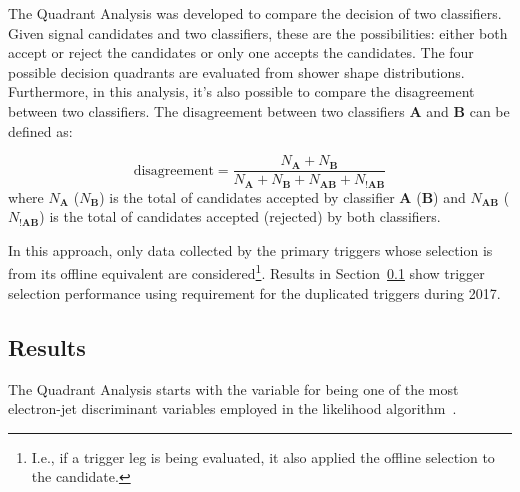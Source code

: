 The Quadrant Analysis was developed to compare the decision of two classifiers. Given signal candidates and two classifiers, these are the possibilities: either both accept or reject the candidates or only one accepts the candidates. The four possible decision quadrants are evaluated from shower shape distributions. Furthermore, in this analysis, it's also possible to compare the disagreement between two classifiers. The disagreement between two classifiers $\textbf{A}$ and $\textbf{B}$ can be defined as:

\begin{equation}
    \text{disagreement} = \frac{N_{\textbf{A}}+N_{\textbf{B}}}{N_{\textbf{A}}+N_{\textbf{B}}+N_{\textbf{AB}}+N_{!\textbf{AB}}}
    \label{eq:disagreement}
\end{equation}
where $N_{\textbf{A}}$ ($N_{\textbf{B}}$) is the total of candidates accepted by classifier $\textbf{A}$ ($\textbf{B}$) and $N_{\textbf{AB}}$ ($N_{\textbf{!AB}}$) is the total of candidates accepted (rejected) by both classifiers.

In this approach, only data collected by the primary triggers whose selection is from its offline equivalent are considered\footnote{I.e., if a \tight{} trigger leg is being evaluated, it also applied the \tight{} offline selection to the candidate.}.
Results in Section~\ref{top:quadrant_results} show
trigger selection performance using \tight{} requirement for the duplicated triggers during 2017.

\subsection{Results}\label{top:quadrant_results}



The Quadrant Analysis starts with the variable \reta{} for being one of the
most electron-jet discriminant variables employed in the likelihood
algorithm~\cite{aaboud2019electron}. 



